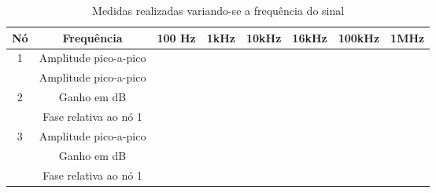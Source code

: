 \documentclass[a4paper]{article} %
\begin{document}
%
\begin{table}
\begin{centering}
\begin{tabular}{|c|c|c|c|c|c|c|c|}
\hline 
Nó & Frequência & 100 Hz & 1kHz & 10kHz & 16kHz & 100kHz & 1MHz\tabularnewline
\hline
\hline 
1 & Amplitude pico-a-pico &  &  &  &  &  & \tabularnewline
\hline 
 & Amplitude pico-a-pico &  &  &  &  &  & \tabularnewline
\cline{2-8} 
2 & \multicolumn{1}{c|}{Ganho em dB} &  &  &  &  &  & \tabularnewline
\hline 
 & Fase relativa ao nó 1 &  &  &  &  &  & \tabularnewline
\hline 
3 & Amplitude pico-a-pico &  &  &  &  &  & \tabularnewline
\hline 
 & Ganho em dB &  &  &  &  &  & \tabularnewline
\hline 
 & Fase relativa ao nó 1 &  &  &  &  &  & \tabularnewline
\hline
\end{tabular}
\par\end{centering}

\caption{Medidas realizadas variando-se a frequência do sinal \label{tab:var-freq}}
\end{table}
\end{document}
